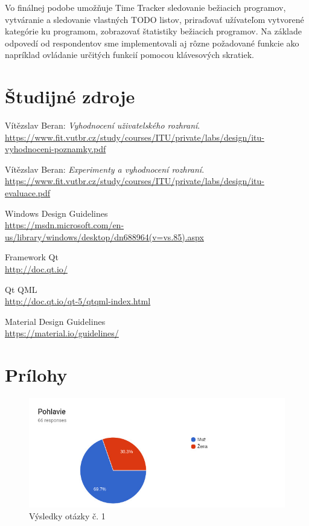 \documentclass[]{article}
\begin{document}
Vo finálnej podobe umožňuje Time Tracker sledovanie bežiacich programov, vytváranie a sledovanie vlastných TODO listov, priraďovať užívateľom vytvorené kategórie ku programom, zobrazovať štatistiky bežiacich programov. Na základe odpovedí od respondentov sme implementovali aj rôzne požadované funkcie ako napríklad ovládanie určitých funkcií pomocou klávesových skratiek.

\newpage

\section{Študijné zdroje}
\label{literatura}
\begin{thebibliography}{3}
	Vítězslav Beran:
	\textit{Vyhodnocení uživatelského rozhraní}.\\
	\url{https://www.fit.vutbr.cz/study/courses/ITU/private/labs/design/itu-vyhodnoceni-poznamky.pdf}
	
	Vítězslav Beran:
	\textit{Experimenty a vyhodnocení rozhraní}.\\
	\url{https://www.fit.vutbr.cz/study/courses/ITU/private/labs/design/itu-evaluace.pdf}
	
	Windows Design Guidelines\\
	\url{https://msdn.microsoft.com/en-us/library/windows/desktop/dn688964(v=vs.85).aspx}
	
	Framework Qt\\
	\url{http://doc.qt.io/}
	
	Qt QML\\
	\url{http://doc.qt.io/qt-5/qtqml-index.html}
	
	Material Design Guidelines\\
	\url{https://material.io/guidelines/}
\end{thebibliography}

\newpage

\section{Prílohy}

\begin{figure}[h!]
	\includegraphics[width=\textwidth]{otazka1}
	\caption{Výsledky otázky č. 1}
\end{figure}
\end{document}
